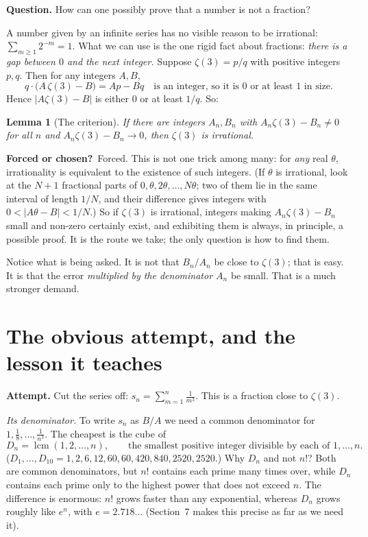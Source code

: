 \documentclass[11pt]{article}
\DeclareMathOperator{\lcm}{lcm}
\newtheorem{lemma}{Lemma}
\theoremstyle{remark}
\newcommand{\q}[1]{\medskip\noindent\textbf{#1}}
\newcommand{\forced}{\medskip\noindent\textbf{Forced or chosen?}\ }
\begin{document}
\q{Question.} How can one possibly prove that a number is not a fraction?

A number given by an infinite series has no visible reason to be irrational: $\sum_{m\ge1}2^{-m}=1$.
What we can use is the one rigid fact about fractions: \emph{there is a gap between $0$ and the
next integer.} Suppose $\zeta(3)=p/q$ with positive integers $p,q$. Then for any integers $A,B$,
\[
q\cdot\bigl(A\,\zeta(3)-B\bigr)=Ap-Bq\quad\text{is an integer, so it is $0$ or at least $1$ in size.}
\]
Hence $|A\zeta(3)-B|$ is either $0$ or at least $1/q$. So:

\begin{lemma}[The criterion]\label{lem:crit}
If there are integers $A_n,B_n$ with $A_n\zeta(3)-B_n\ne0$ for all $n$ and
$A_n\zeta(3)-B_n\to0$, then $\zeta(3)$ is irrational.
\end{lemma}

\forced Forced. This is not one trick among many: for \emph{any} real $\theta$, irrationality is
equivalent to the existence of such integers. (If $\theta$ is irrational, look at the $N+1$
fractional parts of $0,\theta,2\theta,\dots,N\theta$; two of them lie in the same interval of length
$1/N$, and their difference gives integers with $0<|A\theta-B|<1/N$.) So if $\zeta(3)$ is irrational, integers making $A_n\zeta(3)-B_n$ small and non-zero
certainly exist, and exhibiting them is always, in principle, a possible proof. It is the route we
take; the only question is how to find them.

Notice what is being asked. It is not that $B_n/A_n$ be close to $\zeta(3)$; that is easy. It is
that the error \emph{multiplied by the denominator $A_n$} be small. That is a much stronger demand.

\section{The obvious attempt, and the lesson it teaches}

\q{Attempt.} Cut the series off: $s_n=\sum_{m=1}^n\frac1{m^3}$. This is a fraction close to
$\zeta(3)$.

\emph{Its denominator.} To write $s_n$ as $B/A$ we need a common denominator for
$1,\frac18,\dots,\frac1{n^3}$. The cheapest is the cube of
\[
D_n=\lcm(1,2,\dots,n),\qquad\text{the smallest positive integer divisible by each of }1,\dots,n .
\]
($D_1,\dots,D_{10}=1,2,6,12,60,60,420,840,2520,2520$.) Why $D_n$ and not $n!$? Both are common denominators, but $n!$
contains each prime many times over, while $D_n$ contains each prime only to the highest power
that does not exceed $n$. The difference is enormous: $n!$ grows faster than any exponential,
whereas $D_n$ grows roughly like $e^n$, with $e=2.718\ldots$ (Section~7 makes this precise as far
as we need it).
\end{document}
